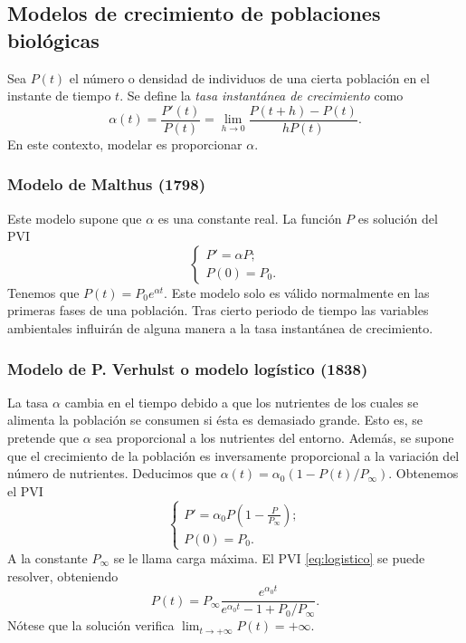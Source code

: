 \documentclass{article}
\begin{document}
\subsection{Modelos de crecimiento de poblaciones biológicas}

Sea $P(t)$ el número o densidad de individuos de una cierta población en el instante de tiempo
$t$. Se define la \emph{tasa instantánea de crecimiento} como 
\[\alpha(t) = \frac{P'(t)}{P(t)} = \lim_{h \to 0} \frac{P(t+h) - P(t)}{h P(t)}.\] 
En este contexto, modelar es proporcionar $\alpha$. 

\subsubsection{Modelo de Malthus (1798)}

Este modelo supone que $\alpha$ es una constante real. La función $P$ es solución del PVI
\begin{equation}
\label{eq:malthus}
\begin{cases}
  P' = \alpha P; \\
  P(0) = P_0.
\end{cases}
\end{equation}
Tenemos que $P(t) = P_0 e^{\alpha t}$. Este modelo solo es válido normalmente en las primeras fases de una población. Tras cierto periodo de tiempo las variables ambientales influirán de alguna manera a la tasa instantánea de crecimiento.

\subsubsection{Modelo de P. Verhulst o modelo logístico (1838) }

La tasa $\alpha$ cambia en el tiempo debido a que los nutrientes de los cuales se alimenta la
población se consumen si ésta es demasiado grande. Esto es, se pretende que $\alpha$ sea
proporcional a los nutrientes del entorno. Además, se supone que el crecimiento de la población es
inversamente proporcional a la variación del número de nutrientes. Deducimos que
$\alpha(t) = \alpha_0 (1 - P(t) / P_{\infty})$. Obtenemos el PVI
\begin{equation}
\label{eq:logistico}
\begin{cases}
  P' = \alpha_0 P (1 - \frac{P}{P_{\infty}}); \\
  P(0) = P_0.
\end{cases}
\end{equation}
A la constante $P_{\infty}$ se le llama carga máxima. El PVI \eqref{eq:logistico} se puede resolver, obteniendo
\[ P(t) = P_{\infty} \frac{e^{\alpha_0 t}}{e^{\alpha_0 t} - 1 + P_0 / P_{\infty}}. \]
Nótese que la solución verifica $\lim_{t \to +\infty} P(t) = +\infty$.
\end{document}

